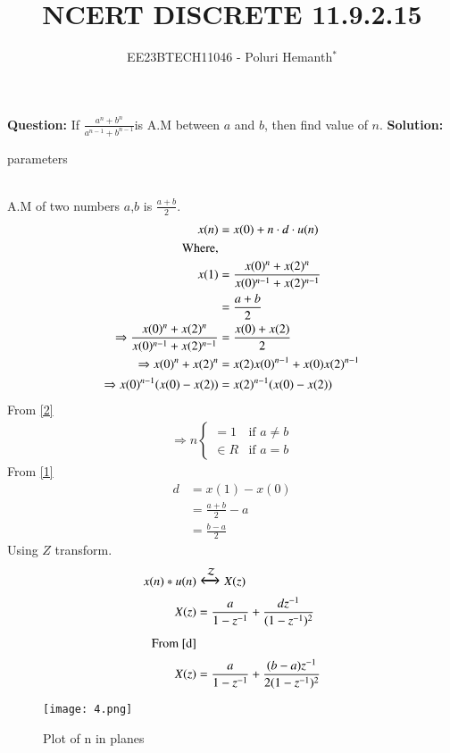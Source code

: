 \documentclass[journal,12pt,twocolumn]{IEEEtran}
\theoremstyle{remark}
\begin{document}

\vspace{3cm}


\title{NCERT DISCRETE 11.9.2.15}
\author{EE23BTECH11046 - Poluri Hemanth$^{*}$}
\maketitle
\textbf{Question:}
If \( \frac{a^n +b^n}{a^{n-1} + b^{n-1}}\)is A.M between $a$ and $b$, then find value of $n$.
\break
\textbf{Solution:}
\begin{table}[h!]
        
        \caption{parameters}
\end{table}
\\A.M of two numbers $a$,$b$ is $\frac{a+b}{2}$.
\begin{align}
	x(n)&=x(0)+n\cdot d\cdot u(n)\label{1}\\
	\notag\text{        Where,}\\
	x(1)&=\frac{x(0)^n +x(2)^n}{x(0)^{n-1} + x(2)^{n-1}}\label{r}\\ 
	&=\frac{a+b}{2}\\
	\Rightarrow\frac{x(0)^n +x(2)^n}{x(0)^{n-1} + x(2)^{n-1}}&= \frac{x(0)+x(2)}{2}  \\
    \Rightarrow x(0)^n+x(2)^n&=x(2)x(0)^{n-1}+x(0)x(2)^{n-1} \\
    \Rightarrow x(0)^{n-1}(x(0)-x(2))&=x(2)^{n-1}(x(0)-x(2))\label{2}
\end{align}
From \eqref{2}
\begin{align}
        \Rightarrow n
        \begin{cases}
                =1  &\text{if } a\neq b\\
                \in R &\text{if } a=b
        \end{cases}
\end{align}
From \eqref{1}\\
\begin{align}
	d&=x(1)-x(0)\\
	&=\frac{a+b}{2}-a\\
	&=\frac{b-a}{2}\label{d}
\end{align}
Using $Z$ transform.
\begin{align}
	x(n)*u(n)&\Large\xleftrightarrow{\mathcal{Z}}X(z)\\
	X(z)&=\frac{a}{1-z^{-1}}+\frac{dz^{-1}}{(1-z^{-1})^2}\label{8}\\
	\notag\text{From \eqref{d}}\\
	X(z)&=\frac{a}{1-z^{-1}}+\frac{(b-a)z^{-1}}{2(1-z^{-1})^2}
\end{align}
\begin{figure}[h]
	\centering
	\texttt{[image: 4.png]}
	\caption{Plot of n in planes}
	\label{solution}
\end{figure}

 
\end{document}
